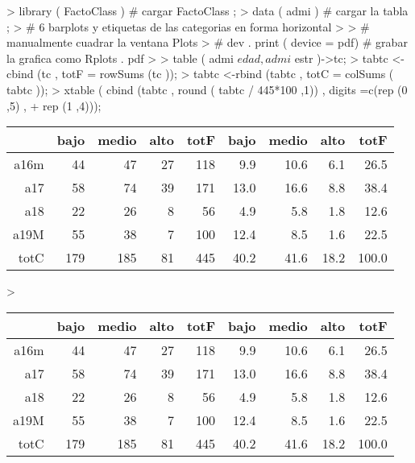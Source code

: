 \documentclass{article}
\begin{document}


\begin{Schunk}
\begin{Sinput}
> library ( FactoClass ) # cargar FactoClass ;
> data ( admi ) # cargar la tabla ;
> # 6 barplots y etiquetas de las categorias en forma horizontal
> 
> # manualmente cuadrar la ventana Plots
> # dev . print ( device = pdf) # grabar la grafica como Rplots . pdf
> 
> table ( admi $edad , admi $ estr )->tc;
> tabtc <-cbind (tc , totF = rowSums (tc ));
> tabtc <-rbind (tabtc , totC = colSums ( tabtc ));
> xtable ( cbind (tabtc , round ( tabtc / 445*100 ,1)) , digits =c(rep (0 ,5) ,
+                                                                  rep (1 ,4)));
\end{Sinput}
\begin{Soutput}
% latex table generated in R 3.6.1 by xtable 1.8-4 package
% Sat Sep 05 12:16:21 2020
\begin{table}[ht]
\centering
\begin{tabular}{rrrrrrrrr}
  \hline
 & bajo & medio & alto & totF & bajo & medio & alto & totF \\ 
  \hline
a16m & 44 & 47 & 27 & 118 & 9.9 & 10.6 & 6.1 & 26.5 \\ 
  a17 & 58 & 74 & 39 & 171 & 13.0 & 16.6 & 8.8 & 38.4 \\ 
  a18 & 22 & 26 & 8 & 56 & 4.9 & 5.8 & 1.8 & 12.6 \\ 
  a19M & 55 & 38 & 7 & 100 & 12.4 & 8.5 & 1.6 & 22.5 \\ 
  totC & 179 & 185 & 81 & 445 & 40.2 & 41.6 & 18.2 & 100.0 \\ 
   \hline
\end{tabular}
\end{table}
\end{Soutput}
\begin{Sinput}
>   
\end{Sinput}
\end{Schunk}

\begin{table}[ht]
\centering
\begin{tabular}{rrrrrrrrr}
\hline
& bajo & medio & alto & totF & bajo & medio & alto & totF \\
\hline
a16m & 44 & 47 & 27 & 118 & 9.9 & 10.6 & 6.1 & 26.5 \\
a17 & 58 & 74 & 39 & 171 & 13.0 & 16.6 & 8.8 & 38.4 \\
a18 & 22 & 26 & 8 & 56 & 4.9 & 5.8 & 1.8 & 12.6 \\
a19M & 55 & 38 & 7 & 100 & 12.4 & 8.5 & 1.6 & 22.5 \\
totC & 179 & 185 & 81 & 445 & 40.2 & 41.6 & 18.2 & 100.0 \\
\hline
\end{tabular}
\end{table}
\end{document}
